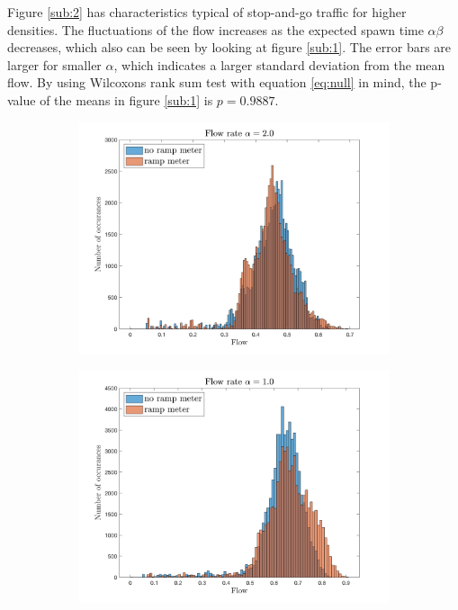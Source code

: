 \documentclass{article}
\begin{document}
    Figure \ref{sub:2} has characteristics typical of stop-and-go traffic for higher densities. The fluctuations of the flow
    increases as the expected spawn time $\alpha\beta$ decreases, which also can be seen by looking at figure \ref{sub:1}. The error bars
    are larger for smaller $\alpha$, which indicates a larger standard deviation from the mean flow. By using
    Wilcoxons rank sum test with equation \ref{eq:null} in mind, the p-value of the means in figure \ref{sub:1} is $p=0.9887$.
    \begin{figure}
      \centering
      \begin{subfigure}{0.33\textwidth}
        \centering
        \includegraphics[width=\linewidth]{fig3.png}
        \caption{ }
        \label{sub:3}
      \end{subfigure}%
      \begin{subfigure}{0.33\textwidth}
        \centering
        \includegraphics[width=\linewidth]{fig4.png}

\end{subfigure}
\end{figure}
\end{document}
